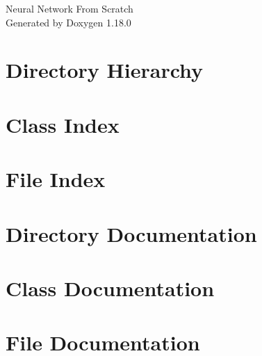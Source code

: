 \documentclass[twoside]{book}
\newcommand{\+}{\discretionary{\mbox{\scriptsize$\hookleftarrow$}}{}{}}
\newcommand{\clearemptydoublepage}{%
    \newpage{\pagestyle{empty}\cleardoublepage}%
  }
\begin{document}
  \raggedbottom
    \hypersetup{pageanchor=false,
                bookmarksnumbered=true,
                pdfencoding=unicode
               }
  \begin{titlepage}
  \vspace*{7cm}
  \begin{center}%
  {\Large Neural Network From Scratch}\\
  \vspace*{1cm}
  {\large Generated by Doxygen 1.18.0}\\
  \end{center}
  \end{titlepage}
  \clearemptydoublepage
  \tableofcontents
  \clearemptydoublepage
  \hypersetup{pageanchor=true}

\chapter{Directory Hierarchy}

\chapter{Class Index}

\chapter{File Index}

\chapter{Directory Documentation}

\chapter{Class Documentation}








\chapter{File Documentation}





















  \backmatter
  \newpage
  \clearemptydoublepage
  \printindex
\end{document}
